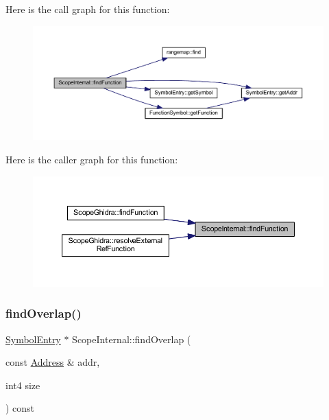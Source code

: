 Here is the call graph for this function\+:
\nopagebreak
\begin{figure}[H]
\begin{center}
\leavevmode
\includegraphics[width=350pt]{class_scope_internal_a03a52c629c51ad660eec8d10cf7f92aa_cgraph}
\end{center}
\end{figure}
Here is the caller graph for this function\+:
\nopagebreak
\begin{figure}[H]
\begin{center}
\leavevmode
\includegraphics[width=350pt]{class_scope_internal_a03a52c629c51ad660eec8d10cf7f92aa_icgraph}
\end{center}
\end{figure}
\mbox{\label{class_scope_internal_a3c241113085be88a74f73d2431de72f3}} 
\subsubsection{\texorpdfstring{findOverlap()}{findOverlap()}}
{\footnotesize\ttfamily \mbox{\hyperlink{class_symbol_entry}{Symbol\+Entry}} $\ast$ Scope\+Internal\+::find\+Overlap (\begin{DoxyParamCaption}\item[{const \mbox{\hyperlink{class_address}{Address}} \&}]{addr,  }\item[{int4}]{size }\end{DoxyParamCaption}) const\hspace{0.3cm}{\ttfamily [virtual]}}



